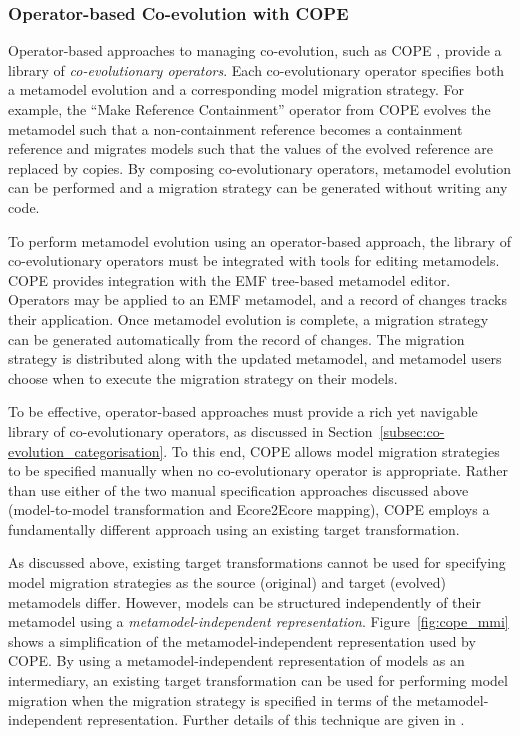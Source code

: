 \subsubsection{Operator-based Co-evolution with COPE}
\label{subsubsec:cope}

Operator-based approaches to managing co-evolution, such as COPE \cite{herrmannsdoerfer09cope}, provide a library of \emph{co-evolutionary operators}. Each co-evolutionary operator specifies both a metamodel evolution and a corresponding model migration strategy. For example, the ``Make Reference Containment'' operator from COPE \cite{herrmannsdoerfer09cope} evolves the metamodel such that a non-containment reference becomes a containment reference and migrates models such that the values of the evolved reference are replaced by copies. By composing co-evolutionary operators, metamodel evolution can be performed and a migration strategy can be generated without writing any code.

To perform metamodel evolution using an operator-based approach, the library of co-evolutionary operators must be integrated with tools for editing metamodels. COPE provides integration with the EMF tree-based metamodel editor. Operators may be applied to an EMF metamodel, and a record of changes tracks their application. Once metamodel evolution is complete, a migration strategy can be generated automatically from the record of changes. The migration strategy is distributed along with the updated metamodel, and metamodel users choose when to execute the migration strategy on their models.

To be effective, operator-based approaches must provide a rich yet navigable library of co-evolutionary operators, as discussed in Section~\ref{subsec:co-evolution_categorisation}. To this end, COPE allows model migration strategies to be specified manually when no co-evolutionary operator is appropriate. Rather than use either of the two manual specification approaches discussed above (model-to-model transformation and Ecore2Ecore mapping), COPE employs a fundamentally different approach using an existing target transformation.

As discussed above, existing target transformations cannot be used for specifying model migration strategies as the source (original) and target (evolved) metamodels differ. However, models can be structured independently of their metamodel using a \emph{metamodel-independent representation}. Figure~\ref{fig:cope_mmi} shows a simplification of the metamodel-independent representation used by COPE. By using a metamodel-independent representation of models as an intermediary, an existing target transformation can be used for performing model migration when the migration strategy is specified in terms of the metamodel-independent representation. Further details of this technique are given in \cite{herrmannsdoerfer09cope}.

